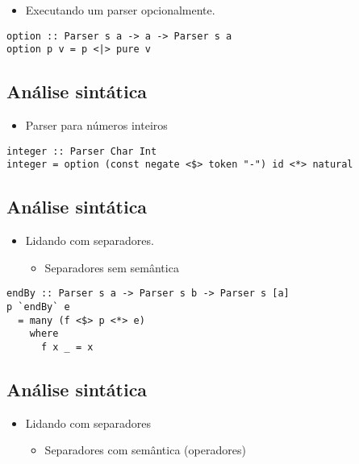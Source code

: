 \documentclass[11pt]{article}
\begin{document}
\begin{itemize}
\item Executando um parser opcionalmente.
\end{itemize}

\begin{verbatim}
option :: Parser s a -> a -> Parser s a 
option p v = p <|> pure v 
\end{verbatim}
\subsection*{Análise sintática}
\label{sec:org424d82b}

\begin{itemize}
\item Parser para números inteiros
\end{itemize}

\begin{verbatim}
integer :: Parser Char Int 
integer = option (const negate <$> token "-") id <*> natural
\end{verbatim}
\subsection*{Análise sintática}
\label{sec:org7514f54}

\begin{itemize}
\item Lidando com separadores. 
\begin{itemize}
\item Separadores sem semântica
\end{itemize}
\end{itemize}

\begin{verbatim}
endBy :: Parser s a -> Parser s b -> Parser s [a]
p `endBy` e 
  = many (f <$> p <*> e) 
    where 
      f x _ = x 
\end{verbatim}
\subsection*{Análise sintática}
\label{sec:org5d2e9aa}

\begin{itemize}
\item Lidando com separadores 
\begin{itemize}
\item Separadores com semântica (operadores)
\end{itemize}
\end{itemize}
\end{document}
